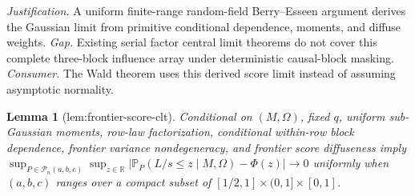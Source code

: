 \documentclass{article}
\newtheorem{lemma}{Lemma}
\begin{document}
\par\smallskip\noindent \textit{Justification.} A uniform finite-range random-field Berry--Esseen argument derives the Gaussian limit from primitive conditional dependence, moments, and diffuse weights. \textit{Gap.} Existing serial factor central limit theorems do not cover this complete three-block influence array under deterministic causal-block masking. \textit{Consumer.} The Wald theorem uses this derived score limit instead of assuming asymptotic normality.

\begin{lemma}[lem:frontier-score-clt]\label{lem:frontier-score-clt}
Conditional on \((M,\Omega)\), fixed \(q\), uniform sub-Gaussian moments, row-law factorization, conditional within-row block dependence, frontier variance nondegeneracy, and frontier score diffuseness imply \(\sup_{P\in\mathcal P_n(a,b,c)}\sup_{z\in\mathbb R}|\mathbb P_P(L/s\le z\mid M,\Omega)-\Phi(z)|\to0\) uniformly when \((a,b,c)\) ranges over a compact subset of \([1/2,1]\times(0,1]\times[0,1]\).
\end{lemma}
\end{document}
